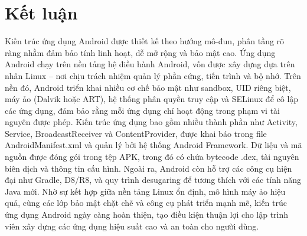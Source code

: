 \section{Kết luận}
    \hspace*{0.8cm}Kiến trúc ứng dụng Android được thiết kế theo hướng mô-đun, phân tầng rõ ràng nhằm đảm bảo tính linh hoạt, dễ mở rộng và bảo mật cao. Ứng dụng Android chạy trên nền tảng hệ điều hành Android, vốn được xây dựng dựa trên nhân Linux – nơi chịu trách nhiệm quản lý phần cứng, tiến trình và bộ nhớ. Trên nền đó, Android triển khai nhiều cơ chế bảo mật như sandbox, UID riêng biệt, máy ảo (Dalvik hoặc ART), hệ thống phân quyền truy cập và SELinux để cô lập các ứng dụng, đảm bảo rằng mỗi ứng dụng chỉ hoạt động trong phạm vi tài nguyên được phép. Kiến trúc ứng dụng bao gồm nhiều thành phần như Activity, Service, BroadcastReceiver và ContentProvider, được khai báo trong file AndroidManifest.xml và quản lý bởi hệ thống Android Framework. Dữ liệu và mã nguồn được đóng gói trong tệp APK, trong đó có chứa bytecode .dex, tài nguyên biên dịch và thông tin cấu hình. Ngoài ra, Android còn hỗ trợ các công cụ hiện đại như Gradle, D8/R8, và quy trình desugaring để tương thích với các tính năng Java mới. Nhờ sự kết hợp giữa nền tảng Linux ổn định, mô hình máy ảo hiệu quả, cùng các lớp bảo mật chặt chẽ và công cụ phát triển mạnh mẽ, kiến trúc ứng dụng Android ngày càng hoàn thiện, tạo điều kiện thuận lợi cho lập trình viên xây dựng các ứng dụng hiệu suất cao và an toàn cho người dùng.\\

